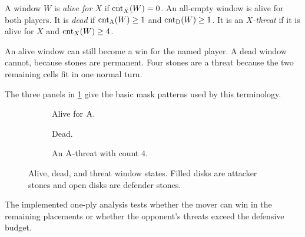\begin{definition}
\label{def:D5}
A window $W$ is \emph{alive for $X$} if
$\operatorname{cnt}_{\bar X}(W)=0$.  An all-empty window is alive for both players.  It is
\emph{dead} if $\operatorname{cnt}_{\mathrm{A}}(W)\ge1$ and $\operatorname{cnt}_{\mathrm{D}}(W)\ge1$.  It is an
\emph{$X$-threat} if it is alive for $X$ and $\operatorname{cnt}_X(W)\ge4$.
\end{definition}

\begin{plainterms}
An alive window can still become a win for the named player.  A dead window
cannot, because stones are permanent.  Four stones are a threat because the
two remaining cells fit in one normal turn.
\end{plainterms}

The three panels in \cref{fig:window-states} give the basic mask patterns used
by this terminology.

\begin{figure}[tbp]
  \centering
  \begin{subfigure}[t]{.30\textwidth}
    \centering
    \caption{Alive for $\mathrm{A}$.}
  \end{subfigure}\hfill
  \begin{subfigure}[t]{.30\textwidth}
    \centering
    \caption{Dead.}
  \end{subfigure}\hfill
  \begin{subfigure}[t]{.30\textwidth}
    \centering
    \caption{An $\mathrm{A}$-threat with count $4$.}
  \end{subfigure}
  \caption{Alive, dead, and threat window states.  Filled disks are attacker
  stones and open disks are defender stones.}
  \label{fig:window-states}
\end{figure}

The implemented one-ply analysis tests whether the mover can win in the
remaining placements or whether the opponent's threats exceed the defensive
budget.

